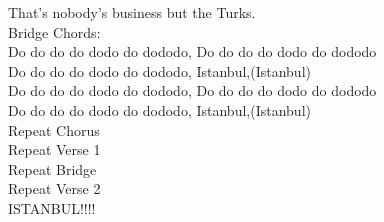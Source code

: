 That's nobody's business but the Turks.\\
Bridge Chords:\\
Do do do do dodo do dododo, Do do do do dodo do dododo\\
Do do do do dodo do dododo, Istanbul,(Istanbul)\\
Do do do do dodo do dododo, Do do do do dodo do dododo\\
Do do do do dodo do dododo, Istanbul,(Istanbul)\\
Repeat Chorus\\
Repeat Verse 1\\
Repeat Bridge\\
Repeat Verse 2\\
ISTANBUL!!!!
